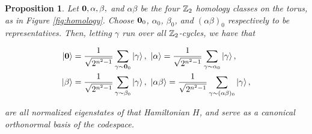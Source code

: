 \documentclass{article}
\newtheorem{proposition}{Proposition}[section]
\theoremstyle{definition}
\numberwithin{figure}{section}
\begin{document}
\begin{proposition}\label{basis} Let $\bold{0},\alpha,\beta,$ and $\alpha\beta$ be the four $\mathbb{Z}_2$ homology classes on the torus, as in Figure \ref{fig:homology}. Choose $\bold{0}_0$, $\alpha_0$, $\beta_0$, and $(\alpha\beta)_0$ respectively to be representatives. Then, letting $\gamma$ run over all $\mathbb{Z}_2$-cycles, we have that

\begin{align*}
\left|\bold{0}\right> &= \frac{1}{\sqrt{2^{n^2-1}}}\sum_{\gamma\sim \bold{0}_0}\left|\gamma\right>,\,\, \left|\alpha\right>=\frac{1}{\sqrt{2^{n^2-1}}}\sum_{\gamma\sim \alpha_0}\left|\gamma\right>,\\
\left|\beta\right> &= \frac{1}{\sqrt{2^{n^2-1}}}\sum_{\gamma\sim \beta_0}\left|\gamma\right>,\,\, \left|\alpha\beta\right>=\frac{1}{\sqrt{2^{n^2-1}}}\sum_{\gamma\sim (\alpha\beta)_0}\left|\gamma\right>,
\end{align*}

are all normalized eigenstates of that Hamiltonian $H$, and serve as a canonical orthonormal basis of the codespace.
\end{proposition}
\end{document}
